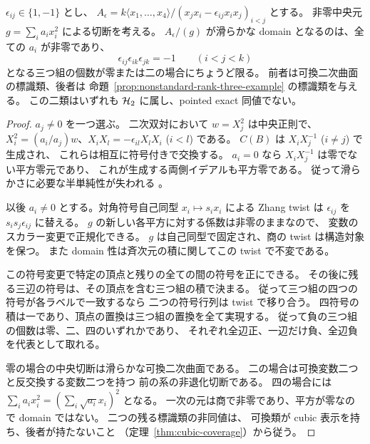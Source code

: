 \begin{theorem}[四変数符号型の対角切断]
\label{thm:sign-quadric-diagonal}
$\epsilon_{ij}\in\{1,-1\}$ とし、
$A_\epsilon=k\langle x_1,\dots,x_4\rangle/
(x_jx_i-\epsilon_{ij}x_ix_j)_{i<j}$ とする。
非零中央元 $g=\sum_i a_i x_i^2$ による切断を考える。
$A_\epsilon/(g)$ が滑らかな domain となるのは、全ての $a_i$ が非零であり、
\[
 \epsilon_{ij}\epsilon_{ik}\epsilon_{jk}=-1
 \qquad(i<j<k)
\]
となる三つ組の個数が零または二の場合にちょうど限る。
前者は可換二次曲面の標識類、後者は
命題~\ref{prop:nonstandard-rank-three-example} の標識類を与える。
この二類はいずれも $\mathcal H_2$ に属し、pointed exact 同値でない。
\end{theorem}

\begin{proof}
$a_j\ne0$ を一つ選ぶ。
二次双対において $w=X_j^2$ は中央正則で、
$X_i^2=(a_i/a_j)w$、$X_iX_l=-\epsilon_{il}X_lX_i$ ($i<l$) である。
$C(B)$ は $X_iX_j^{-1}$ ($i\ne j$) で生成され、
これらは相互に符号付きで交換する。
$a_i=0$ なら $X_iX_j^{-1}$ は零でない平方零元であり、
これが生成する両側イデアルも平方零である。
従って滑らかさに必要な半単純性が失われる
\cite[Theorem 5.5]{MU2022}。

以後 $a_i\ne0$ とする。対角符号自己同型 $x_i\mapsto s_i x_i$ による
Zhang twist は $\epsilon_{ij}$ を $s_i s_j\epsilon_{ij}$ に替える。
$g$ の新しい各平方に対する係数は非零のままなので、
変数のスカラー変更で正規化できる。
$g$ は自己同型で固定され、商の twist は構造対象を保つ。
また domain 性は斉次元の積に関してこの twist で不変である。

この符号変更で特定の頂点と残りの全ての間の符号を正にできる。
その後に残る三辺の符号は、その頂点を含む三つ組の積で決まる。
従って三つ組の四つの符号が各ラベルで一致するなら
二つの符号行列は twist で移り合う。
四符号の積は一であり、頂点の置換は三つ組の置換を全て実現する。
従って負の三つ組の個数は零、二、四のいずれかであり、
それぞれ全辺正、一辺だけ負、全辺負を代表として取れる。

零の場合の中央切断は滑らかな可換二次曲面である。
二の場合は可換変数二つと反交換する変数二つを持つ
前の系の非退化切断である。
四の場合には $\sum_i a_i x_i^2=(\sum_i \sqrt{a_i}x_i)^2$ となる。
一次の元は商で非零であり、平方が零なので domain ではない。
二つの残る標識類の非同値は、
可換類が cubic 表示を持ち、後者が持たないこと
（定理~\ref{thm:cubic-coverage}）から従う。
\end{proof}
